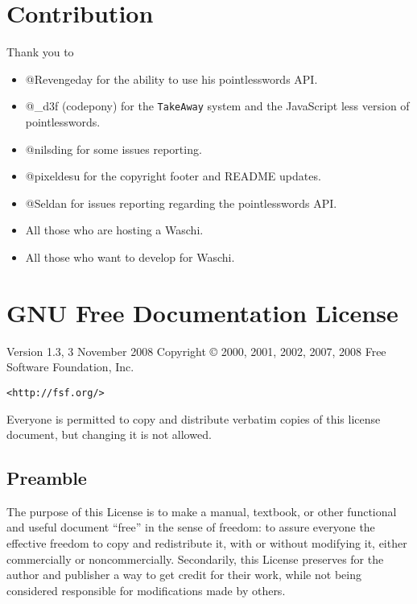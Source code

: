 \documentclass[letterpaper,twoside]{scrartcl}
\begin{document}
 \newpage


 \section{Contribution}
  Thank you to \newline
  \begin{itemize}
   \item @Revengeday for the ability to use his pointlesswords API.
   \item @\_d3f (codepony) for the \texttt{TakeAway} system and the JavaScript less version of pointlesswords.
   \item @nilsding for some issues reporting.
   \item @pixeldesu for the copyright footer and README updates.
   \item @Seldan for issues reporting regarding the pointlesswords API.
   \item All those who are hosting a Waschi.
   \item All those who want to develop for Waschi.
  \end{itemize}


 \newpage


 \section{GNU Free Documentation License}
  \label{label_fdl}

  \begin{center}

   Version 1.3, 3 November 2008
   Copyright \copyright{} 2000, 2001, 2002, 2007, 2008  Free Software Foundation, Inc.
	  
   \texttt{<http://fsf.org/>}
  \end{center}	    
	   
    
  Everyone is permitted to copy and distribute verbatim copies
  of this license document, but changing it is not allowed.
      
  \subsection{Preamble}
  

   The purpose of this License is to make a manual, textbook, or other
   functional and useful document ``free'' in the sense of freedom: to
   assure everyone the effective freedom to copy and redistribute it,
   with or without modifying it, either commercially or noncommercially.
   Secondarily, this License preserves for the author and publisher a way
   to get credit for their work, while not being considered responsible
   for modifications made by others.
\end{document}
